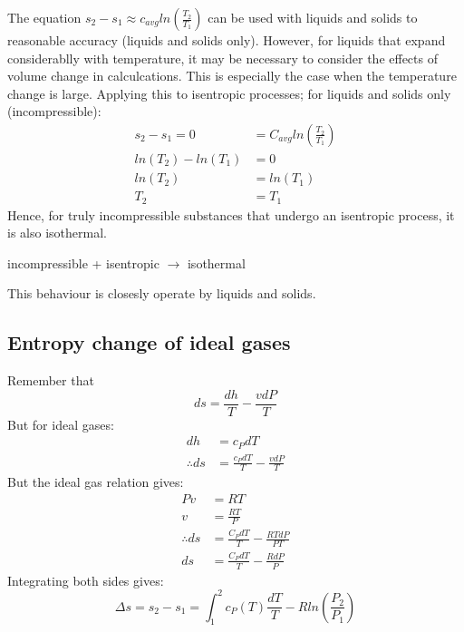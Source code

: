 \documentclass[class=report, crop=false, 12pt,a4paper]{standalone}
\begin{document}
The equation \( s_2 - s_1 \approx c_{avg} ln(\frac{T_2}{T_1}) \) can be used with liquids and solids to reasonable accuracy (liquids and solids only). However, for liquids that expand considerablly with temperature, it may be necessary to consider the effects of volume change in calculcations. This is especially the case when the temperature change is large. Applying this to isentropic processes; for liquids and solids only (incompressible):
\begin{align*}
  s_2 - s_1 = 0 &= C_{avg} ln(\frac{T_2}{T_1})\\
  ln(T_2) - ln(T_1) &= 0 \\
  ln(T_2) &= ln(T_1)\\
  T_2 &= T_1
\end{align*}
Hence, for truly incompressible substances that undergo an isentropic process, it is also isothermal.
\begin{center}
  incompressible + isentropic \(\rightarrow\) isothermal
\end{center}
This behaviour is closesly operate by liquids and solids. 
\subsection{Entropy change of ideal gases}
Remember that 
\[ ds = \frac{dh}{T} - \frac{vdP}{T} \]
But for ideal gases:
\begin{align*}
  dh &= c_P dT\\
  \therefore ds &= \frac{c_PdT}{T} - \frac{vdP}{T}
\end{align*}
But the ideal gas relation gives:
\begin{align*}
  Pv&=RT\\
  v&=\frac{RT}{P}\\
  \therefore ds &= \frac{C_PdT}{T} - \frac{RTdP}{PT}\\
  ds &= \frac{C_PdT}{T} - \frac{RdP}{P}
\end{align*}
Integrating both sides gives:
\[ \Delta s = s_2 - s_1 = \int_1^2 c_P(T)\frac{dT}{T} - Rln\left(\frac{P_2}{P_1}\right) \]
\end{document}
